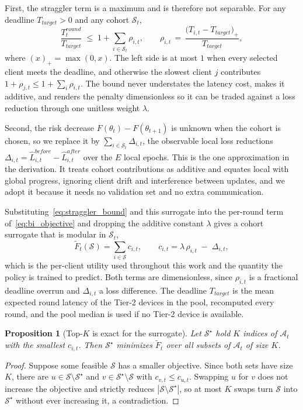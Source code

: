 \documentclass[journal]{IEEEtran}
\newtheorem{proposition}{Proposition}
\theoremstyle{remark}
\newcommand{\revtwo}[1]{#1}
\newcommand{\revtwoeq}{}
\begin{document}
\revtwo{First, the straggler term is a maximum and is therefore not separable. For any deadline $T_{target}>0$ and any cohort $\mathcal{S}_t$,}
\begin{equation}
	\revtwoeq \frac{T_t^{round}}{T_{target}}\;\le\;1+\sum_{i\in\mathcal{S}_t}\rho_{i,t},\qquad
	\rho_{i,t}\,=\,\frac{\bigl(T_{i,t}-T_{target}\bigr)_{+}}{T_{target}},
	\label{eq:straggler_bound}
\end{equation}
\revtwo{where $(x)_+=\max(0,x)$. The left side is at most $1$ when every selected client meets the deadline, and otherwise the slowest client $j$ contributes $1+\rho_{j,t}\le 1+\sum_i\rho_{i,t}$. The bound never understates the latency cost, makes it additive, and renders the penalty dimensionless so it can be traded against a loss reduction through one unitless weight $\lambda$.}

\revtwo{Second, the risk decrease $F(\theta_t)-F(\theta_{t+1})$ is unknown when the cohort is chosen, so we replace it by $\sum_{i\in\mathcal{S}_t}\Delta_{i,t}$, the observable local loss reductions $\Delta_{i,t}=\hat{L}^{before}_{i,t}-\hat{L}^{after}_{i,t}$ over the $E$ local epochs. This is the one approximation in the derivation. It treats cohort contributions as additive and equates local with global progress, ignoring client drift and interference between updates, and we adopt it because it needs no validation set and no extra communication.}

\revtwo{Substituting~\eqref{eq:straggler_bound} and this surrogate into the per-round term of~\eqref{eq:bi_objective} and dropping the additive constant $\lambda$ gives a cohort surrogate that is modular in $\mathcal{S}_t$,}
\begin{equation}
	\revtwoeq \widetilde{F}_t(\mathcal{S})=\sum_{i\in\mathcal{S}}c_{i,t},\qquad
	c_{i,t}=\lambda\,\rho_{i,t}\;-\;\Delta_{i,t} ,
	\label{eq:cost}
\end{equation}
\revtwo{which is the per-client utility used throughout this work and the quantity the policy is trained to predict. Both terms are dimensionless, since $\rho_{i,t}$ is a fractional deadline overrun and $\Delta_{i,t}$ a loss difference. The deadline $T_{target}$ is the mean expected round latency of the Tier-2 devices in the pool, recomputed every round, and the pool median is used if no Tier-2 device is available.}

\begin{proposition}[\revtwo{Top-$K$ is exact for the surrogate}]\label{prop:topk}
\revtwo{Let $\mathcal{S}^\star$ hold $K$ indices of $\mathcal{A}_t$ with the smallest $c_{i,t}$. Then $\mathcal{S}^\star$ minimizes $\widetilde{F}_t$ over all subsets of $\mathcal{A}_t$ of size $K$.}
\end{proposition}
\begin{proof}
\revtwo{Suppose some feasible $\mathcal{S}$ has a smaller objective. Since both sets have size $K$, there are $u\in\mathcal{S}\setminus\mathcal{S}^\star$ and $v\in\mathcal{S}^\star\setminus\mathcal{S}$ with $c_{v,t}\le c_{u,t}$. Swapping $u$ for $v$ does not increase the objective and strictly reduces $|\mathcal{S}\setminus\mathcal{S}^\star|$, so at most $K$ swaps turn $\mathcal{S}$ into $\mathcal{S}^\star$ without ever increasing it, a contradiction.}
\end{proof}
\end{document}
